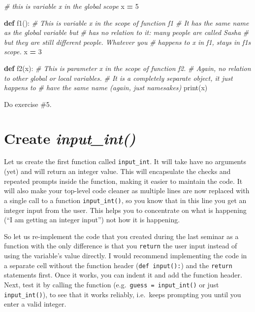 \documentclass[
]{book}
\newenvironment{Shaded}{\begin{snugshade}}{\end{snugshade}}
\newcommand{\BuiltInTok}[1]{#1}
\newcommand{\CommentTok}[1]{\textcolor[rgb]{0.56,0.35,0.01}{\textit{#1}}}
\newcommand{\DecValTok}[1]{\textcolor[rgb]{0.00,0.00,0.81}{#1}}
\newcommand{\KeywordTok}[1]{\textcolor[rgb]{0.13,0.29,0.53}{\textbf{#1}}}
\newcommand{\NormalTok}[1]{#1}
\newcommand{\OperatorTok}[1]{\textcolor[rgb]{0.81,0.36,0.00}{\textbf{#1}}}
\begin{document}
\begin{Shaded}
\begin{Highlighting}[]
\CommentTok{\# this is variable \textasciigrave{}x\textasciigrave{} in the global scope}
\NormalTok{x  }\OperatorTok{=} \DecValTok{5} 

\KeywordTok{def}\NormalTok{ f1():}
  \CommentTok{\# This is variable \textasciigrave{}x\textasciigrave{} in the scope of function f1}
  \CommentTok{\# It has the same name as the global variable but}
  \CommentTok{\# has no relation to it: many people are called Sasha }
  \CommentTok{\# but they are still different people. Whatever you}
  \CommentTok{\# happens to \textasciigrave{}x\textasciigrave{} in f1, stays in f1\textquotesingle{}s scope.}
\NormalTok{  x }\OperatorTok{=} \DecValTok{3}
  
  
\KeywordTok{def}\NormalTok{ f2(x):}
  \CommentTok{\# This is parameter \textasciigrave{}x\textasciigrave{} in the scope of function f2.}
  \CommentTok{\# Again, no relation to other global or local variables.}
  \CommentTok{\# It is a completely separate object, it just happens to }
  \CommentTok{\# have the same name (again, just namesakes)}
  \BuiltInTok{print}\NormalTok{(x)}
\end{Highlighting}
\end{Shaded}

Do exercise \#5.

\hypertarget{create-input_int}{%
\section{\texorpdfstring{Create \emph{input\_int()}}{Create input\_int()}}\label{create-input_int}}

Let us create the first function called \texttt{input\_int}. It will take have no arguments (yet) and will return an integer value. This will encapsulate the checks and repeated prompts inside the function, making it easier to maintain the code. It will also make your top-level code cleaner as multiple lines are now replaced with a single call to a function \texttt{input\_int()}, so you know that in this line you get an integer input from the user. This helps you to concentrate on what is happening (``I am getting an integer input'') not how it is happening.

So let us re-implement the code that you created during the last seminar as a function with the only difference is that you \texttt{return} the user input instead of using the variable's value directly. I would recommend implementing the code in a separate cell without the function header (\texttt{def\ input():}) and the \texttt{return} statements first. Once it works, you can indent it and add the function header. Next, test it by calling the function (e.g.~\texttt{guess\ =\ input\_int()} or just \texttt{input\_int()}), to see that it works reliably, i.e.~keeps prompting you until you enter a valid integer.
\end{document}
